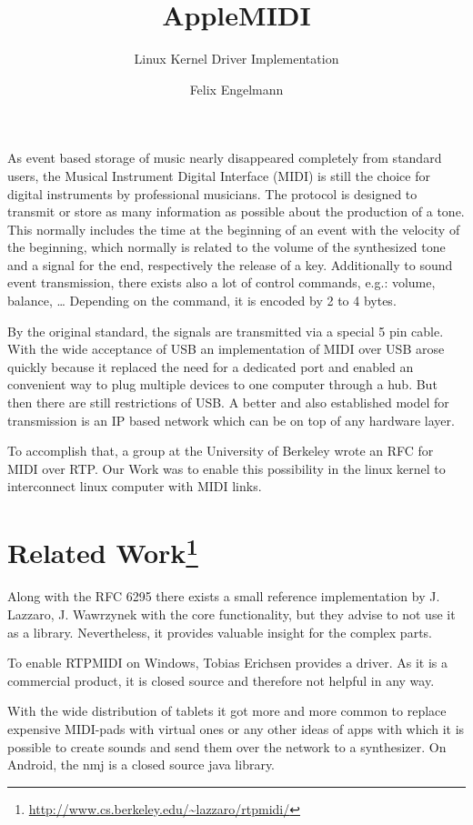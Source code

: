 \documentclass[paper=a4,fontsize=11pt,twocolumn,pagesize,bibtotoc]{scrartcl}
\title{AppleMIDI}
\subtitle{Linux Kernel Driver Implementation}
\author{Felix Engelmann}
\begin{document}
	\maketitle
	
	As event based storage of music nearly disappeared completely from standard users, the 
	Musical Instrument Digital Interface (MIDI)
	is still the choice for digital instruments by professional musicians. The protocol is designed to transmit or store as many information as possible about the production of a tone. This normally includes the time at the beginning of an event with the velocity of the beginning, which normally is related to the volume of the synthesized tone and a signal for the end, respectively the release of a key. Additionally to sound event transmission, there exists also a lot of control commands, e.g.: volume, balance, \dots
	Depending on the command, it is encoded by 2 to 4 bytes.
	
	By the original standard, the signals are transmitted via a special 5 pin cable. With the wide acceptance of USB an implementation of MIDI over USB arose quickly because it replaced the need for a dedicated port and enabled an convenient way to plug multiple devices to one computer through a hub. But then there are still restrictions of USB. A better and also established model for transmission is an IP based network which can be on top of any hardware layer.
	
	To accomplish that, a group at the University of Berkeley wrote an RFC for MIDI over RTP. Our Work was to enable this possibility in the linux kernel to interconnect linux computer with MIDI links.
	
	\section[Related Work]{Related Work\footnote{\url{http://www.cs.berkeley.edu/\~lazzaro/rtpmidi/}}}
	Along with the RFC 6295 there exists a small reference implementation by 
	J. Lazzaro, J. Wawrzynek
	with the core functionality, but they advise to not use it as a library. Nevertheless, it provides valuable insight for the complex parts.
	
	To enable RTPMIDI on Windows,
	Tobias Erichsen
	provides a driver. As it is a commercial product, it is closed source and therefore not helpful in any way.
	
	With the wide distribution of tablets it got more and more common to replace expensive MIDI-pads with virtual ones or any other ideas of apps with which it is possible to create sounds and send them over the network to a synthesizer. On Android, the nmj is a closed source java library.
	
\end{document}
